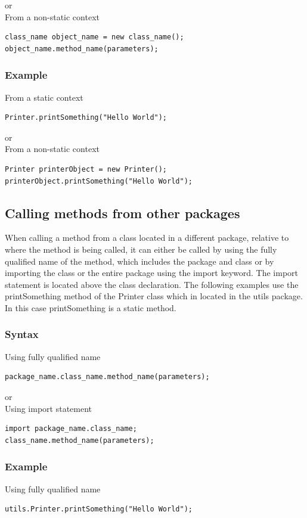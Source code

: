 \documentclass[a4paper]{article}
\begin{document}
or
\\From a non-static context
\begin{lstlisting}
class_name object_name = new class_name();
object_name.method_name(parameters);
\end{lstlisting}


\subsubsection*{Example}
From a static context
\begin{lstlisting}
Printer.printSomething("Hello World");
\end{lstlisting}

or
\\From a non-static context
\begin{lstlisting}
Printer printerObject = new Printer();
printerObject.printSomething("Hello World");
\end{lstlisting}

\subsection*{Calling methods from other packages}
When calling a method from a class located in a different package, relative to where the method is being called, it can either be called by using the fully qualified name of the method, which includes the package and class or by importing the class or the entire package using the import keyword. The import statement is located above the class declaration.
The following examples use the printSomething method of the Printer class which in located in the utils package. In this case  printSomething is a static method.

\subsubsection*{Syntax}
Using fully qualified name
\begin{lstlisting}
package_name.class_name.method_name(parameters);
\end{lstlisting}
\newpage
or
\\Using import statement
\begin{lstlisting}
import package_name.class_name;
class_name.method_name(parameters);
\end{lstlisting}


\subsubsection*{Example}
Using fully qualified name
\begin{lstlisting}
utils.Printer.printSomething("Hello World");
\end{lstlisting}
\end{document}

